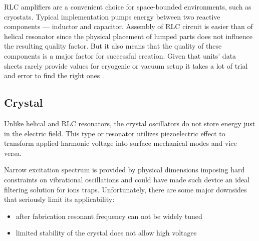RLC amplifiers are a convenient choice for space-bounded environments, such as cryostats. Typical implementation pumps energy between two reactive components --- inductor and capacitor. Assembly of RLC circuit is easier than of helical resonator since the physical placement of lumped parts does not influence the resulting quality factor. But it also means that the quality of these components is a major factor for successful creation. Given that units' data sheets rarely provide values for cryogenic or vacuum setup it takes a lot of trial and error to find the right ones \cite{Gandolfi2010}.
\subsection{Crystal}
Unlike helical and RLC resonators, the crystal oscillators do not store energy just in the electric field. This type or resonator utilizes piezoelectric effect to transform applied harmonic voltage into surface mechanical modes and vice versa.

Narrow excitation spectrum is provided by physical dimensions imposing hard constraints on vibrational oscillations and could have made such device an ideal filtering solution for ions traps. Unfortunately, there are some major downsides that seriously limit its applicability:
\begin{itemize}
	\item after fabrication resonant frequency can not be widely tuned
	\item limited stability of the crystal does not allow high voltages
\end{itemize}
